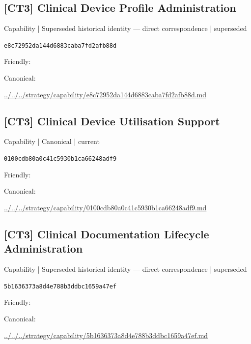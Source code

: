 \documentclass[10pt,a4paper]{article}
\begin{document}
\subsection*{[CT3] Clinical Device Profile Administration}
{\small Capability | Superseded historical identity — direct correspondence | superseded}\par
\texttt{e8c72952da144d6883caba7fd2afb88d}\par
Friendly: \par
Canonical: \par
{\footnotesize\url{../../../strategy/capability/e8c72952da144d6883caba7fd2afb88d.md}}\par
\subsection*{[CT3] Clinical Device Utilisation Support}
{\small Capability | Canonical | current}\par
\texttt{0100cdb80a0c41c5930b1ca66248adf9}\par
Friendly: \par
Canonical: \par
{\footnotesize\url{../../../strategy/capability/0100cdb80a0c41c5930b1ca66248adf9.md}}\par
\subsection*{[CT3] Clinical Documentation Lifecycle Administration}
{\small Capability | Superseded historical identity — direct correspondence | superseded}\par
\texttt{5b1636373a8d4e788b3ddbc1659a47ef}\par
Friendly: \par
Canonical: \par
{\footnotesize\url{../../../strategy/capability/5b1636373a8d4e788b3ddbc1659a47ef.md}}\par
\end{document}
